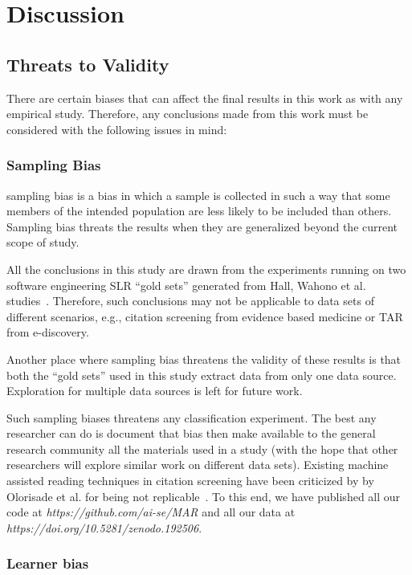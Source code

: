 \documentclass[final,twocolumn,5p]{elsarticle}
\theoremstyle{break}
\begin{document}
\section{Discussion}

\subsection{Threats to Validity}
\label{sect: Threats to Validity}

There are certain biases that can affect the final
results in this work as with any empirical study. Therefore, any conclusions made from this work must be considered with the following issues in mind:


\subsubsection{Sampling Bias}

sampling bias is a bias in which a sample is collected in such a way that some members of the intended population are less likely to be included than others. Sampling bias threats the results when they are generalized beyond the current scope of study.

All the conclusions in this study are drawn from the experiments running on two software engineering SLR ``gold sets'' generated from Hall, Wahono et al. studies~\cite{hall2012systematic,wahono2015systematic}. Therefore, such conclusions may not be applicable to data sets of different scenarios, e.g., citation screening from evidence based medicine or TAR from e-discovery.

Another place where sampling bias threatens the validity of these results is that both
the ``gold sets'' used in this study extract data from only one data source. Exploration for multiple data sources is left for future work. 

Such sampling biases threatens any classification experiment. The best any researcher can do is document that bias then make available to the general research community all the materials used in a study (with the hope that other researchers will explore similar work on different data sets). Existing machine assisted reading techniques in citation screening have been criticized by by Olorisade et al. for being not replicable~\cite{olorisade2016critical}. To this end, we have published all our code at \textit{https://github.com/ai-se/MAR} and all our data at \textit{https://doi.org/10.5281/zenodo.192506}.

\subsubsection{Learner bias}
\end{document}
